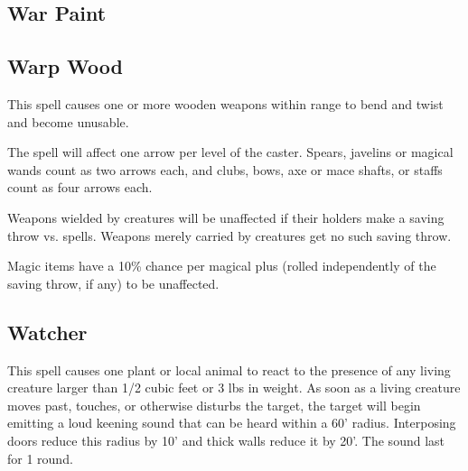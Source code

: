 \begin{multicols*}{2}
\subsection{War Paint}\label{spell:War Paint}



\subsection{Warp Wood}\label{spell:Warp Wood}

This spell causes one or more wooden weapons within range to bend and twist and become unusable.

The spell will affect one arrow per level of the caster. Spears, javelins or magical wands count as two arrows each, and clubs, bows, axe or mace shafts, or staffs count as four arrows each.

Weapons wielded by creatures will be unaffected if their holders make a saving throw vs. spells. Weapons merely carried by creatures get no such saving throw.

Magic items have a 10\% chance per magical plus (rolled independently of the saving throw, if any) to be unaffected.

\subsection{Watcher}\label{spell:Watcher}

This spell causes one plant or local animal to react to the presence of any living creature larger than 1/2 cubic feet or 3 lbs in weight. As soon as a living creature moves past, touches, or otherwise disturbs the target, the target will begin emitting a loud keening sound that can be heard within a 60' radius. Interposing doors reduce this radius by 10' and thick walls reduce it by 20'. The sound last for 1 round.


\end{multicols*}
